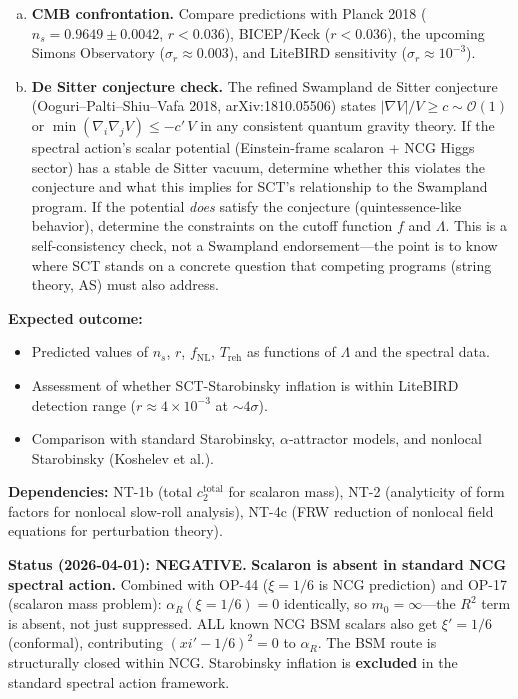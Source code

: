 \documentclass[12pt,a4paper]{article}
\newcommand{\outcome}[1]{\noindent\textbf{Expected outcome:} #1\par}
\newcommand{\deps}[1]{\noindent\textbf{Dependencies:} #1\par}
\begin{document}
{\begin{enumerate}[(a)]
  \item \textbf{CMB confrontation.} Compare predictions with Planck 2018
    ($n_s = 0.9649 \pm 0.0042$, $r < 0.036$), BICEP/Keck ($r < 0.036$),
    the upcoming Simons Observatory ($\sigma_r \approx 0.003$),
    and LiteBIRD sensitivity ($\sigma_r \approx 10^{-3}$).
  \item \textbf{De Sitter conjecture check.}
    The refined Swampland de Sitter conjecture (Ooguri--Palti--Shiu--Vafa 2018,
    arXiv:1810.05506) states
    $|\nabla V|/V \geq c \sim \mathcal{O}(1)$ or $\min(\nabla_i\nabla_j V) \leq
    -c'\,V$ in any consistent quantum gravity theory. If the spectral action's
    scalar potential (Einstein-frame scalaron + NCG Higgs sector) has a stable
    de Sitter vacuum, determine whether this violates the conjecture and what
    this implies for SCT's relationship to the Swampland program. If the
    potential \emph{does} satisfy the conjecture (quintessence-like behavior),
    determine the constraints on the cutoff function $f$ and $\Lambda$.
    This is a self-consistency check, not a Swampland endorsement---the point
    is to know where SCT stands on a concrete question that competing programs
    (string theory, AS) must also address.
\end{enumerate}
}

\outcome{
\begin{itemize}
  \item Predicted values of $n_s$, $r$, $f_{\text{NL}}$, $T_{\text{reh}}$
    as functions of $\Lambda$ and the spectral data.
  \item Assessment of whether SCT-Starobinsky inflation is within
    LiteBIRD detection range ($r \approx 4 \times 10^{-3}$ at $\sim 4\sigma$).
  \item Comparison with standard Starobinsky, $\alpha$-attractor models,
    and nonlocal Starobinsky (Koshelev et al.).
\end{itemize}
}

\deps{NT-1b (total $c_2^{\text{total}}$ for scalaron mass),
NT-2 (analyticity of form factors for nonlocal slow-roll analysis),
NT-4c (FRW reduction of nonlocal field equations for perturbation theory).}

\textcolor{long}{\textbf{Status (2026-04-01): NEGATIVE.}}
\textbf{Scalaron is absent in standard NCG spectral action.}
Combined with OP-44 ($\xi = 1/6$ is NCG prediction) and OP-17
(scalaron mass problem): $\alpha_R(\xi = 1/6) = 0$ identically,
so $m_0 = \infty$---the $R^2$ term is absent, not just suppressed.
ALL known NCG BSM scalars also get $\xi' = 1/6$ (conformal),
contributing $(xi'-1/6)^2 = 0$ to $\alpha_R$.  The BSM route is
structurally closed within NCG.  Starobinsky inflation is
\textbf{excluded} in the standard spectral action framework.
\end{document}
